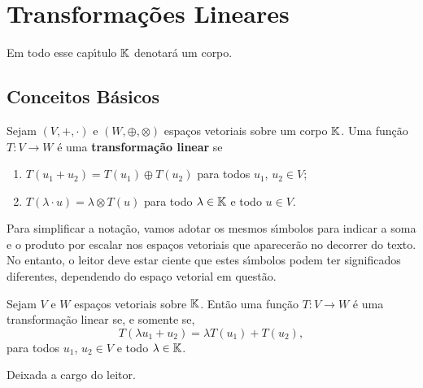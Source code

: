 
\chapter{Transforma\c{c}\~oes Lineares}

Em todo esse cap{\'\i}tulo $\mathbb{K}$ denotar\'a um corpo.

\section{Conceitos B\'asicos}

\begin{definicao}
	Sejam $(V, +, \cdot)$ e $(W, \oplus, \otimes)$ espa\c{c}os vetoriais sobre um corpo $\mathbb{K}$. Uma fun\c{c}\~ao $T : V \to W$ \'e uma \textbf{transforma\c{c}\~ao linear} se
	\begin{enumerate}[label={\roman*})]
		\item $T(u_1 + u_2) = T(u_1) \oplus T(u_2)$ para todos $u_1$, $u_2 \in V$;
		\item $T(\lambda \cdot u) = \lambda \otimes T(u)$ para todo $\lambda \in \mathbb{K}$ e todo $u \in V$.
	\end{enumerate}
\end{definicao}

\begin{observacao}
	Para simplificar a nota\c{c}\~ao, vamos adotar os mesmos s{\'\i}mbolos para indicar a soma e o produto por escalar nos espa\c{c}os vetoriais que aparecer\~ao no decorrer do texto. No entanto, o leitor deve estar ciente que estes s{\'\i}mbolos podem ter significados diferentes, dependendo do espa\c{c}o vetorial em quest\~ao.
\end{observacao}

\begin{lema}
	Sejam $V$ e $W$ espa\c{c}os vetoriais sobre $\mathbb{K}$. Ent\~ao uma fun\c{c}\~ao $T : V \to W$ \'e uma transforma\c{c}\~ao linear se, e somente se,
	\[
		T(\lambda u_1 + u_2) = \lambda T(u_1) + T(u_2),
	\]
	para todos $u_1$, $u_2 \in V$ e todo $\lambda \in \mathbb{K}$.
\end{lema}
\begin{prova}
	Deixada a cargo do leitor.
\end{prova}

